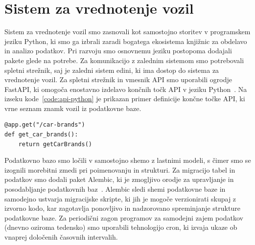 \documentclass[a4paper,12pt,openright]{book}
\begin{document}
\section{Sistem za vrednotenje vozil}
Sistem za vrednotenje vozil smo zasnovali kot samostojno storitev v programskem jeziku
Python, ki smo ga izbrali zaradi bogatega ekosistema knjižnic za obdelavo in analizo podatkov.
 Pri razvoju smo osnovnemu jeziku postopoma dodajali pakete glede na potrebe. Za komunikacijo z zalednim
  sistemom smo potrebovali spletni strežnik, saj je zaledni sistem edini, ki ima dostop do sistema za vrednotenje vozil.
Za spletni strežnik in vmesnik API smo uporabili ogrodje FastAPI, ki omogoča enostavno izdelavo končnih točk API v
 jeziku Python~\cite{fastapi-docs}. Na izseku kode~\ref{code:api-python} je prikazan primer definicije končne točke API, ki vrne seznam znamk vozil iz podatkovne baze.
\begin{center}
\label{code:api-python}
\begin{verbatim}
@app.get("/car-brands")
def get_car_brands():
    return getCarBrands()
\end{verbatim}
\end{center}
Podatkovno bazo smo ločili v samostojno shemo z lastnimi modeli, s čimer 
 smo se izognili morebitni zmedi pri poimenovanju in strukturi.
Za migracijo tabel in podatkov smo dodali paket Alembic, ki je zmogljivo orodje za upravljanje
 in posodabljanje podatkovnih baz~\cite{alembic-docs}. Alembic sledi shemi podatkovne baze in samodejno 
 ustvarja migracijske skripte, ki jih je mogoče verzionirati skupaj z izvorno kodo, kar zagotavlja ponovljivo 
 in nadzorovano spreminjanje strukture podatkovne baze.
Za periodični zagon programov za samodejni zajem podatkov (dnevno oziroma tedensko) smo
uporabili tehnologijo cron, ki izvaja ukaze ob vnaprej določenih časovnih intervalih.
\end{document}
